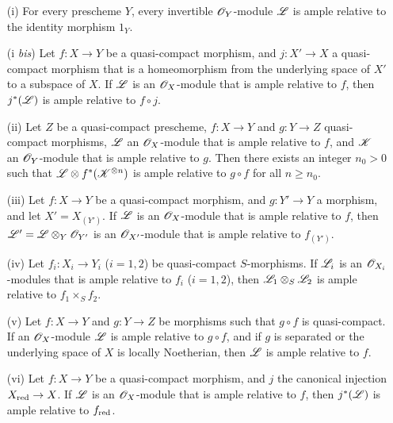 \begin{proposition}[4.6.13]
\label{II.4.6.13}
\begin{enumerate}
  \item[\rm{(i)}] For every prescheme $Y$, every invertible $\mathscr{O}_Y$-module $\mathscr{L}$ is ample relative to the identity morphism $1_Y$.
  \item[\rm{(i \emph{bis})}] Let $f:X\to Y$ be a quasi-compact morphism, and $j:X'\to X$ a quasi-compact morphism that is a homeomorphism from the underlying space of $X'$ to a subspace of $X$.
    If $\mathscr{L}$ is an $\mathscr{O}_X$-module that is ample relative to $f$, then $j^*(\mathscr{L})$ is ample relative to $f\circ j$.
  \item[\rm{(ii)}] Let $Z$ be a quasi-compact prescheme, $f:X\to Y$ and $g:Y\to Z$ quasi-compact morphisms, $\mathscr{L}$ an $\mathscr{O}_X$-module that is ample relative to $f$, and $\mathscr{K}$ an $\mathscr{O}_Y$-module that is ample relative to $g$.
    Then there exists an integer $n_0>0$ such that $\mathscr{L}\otimes f^*(\mathscr{K}^{\otimes n})$ is ample relative to $g\circ f$ for all $n\geq n_0$.
  \item[\rm{(iii)}] Let $f:X\to Y$ be a quasi-compact morphism, and $g:Y'\to Y$ a morphism, and let $X'=X_{(Y')}$.
    If $\mathscr{L}$ is an $\mathscr{O}_X$-module that is ample relative to $f$, then $\mathscr{L}'=\mathscr{L}\otimes_Y\mathscr{O}_{Y'}$ is an $\mathscr{O}_{X'}$-module that is ample relative to $f_{(Y')}$.
  \item[\rm{(iv)}] Let $f_i:X_i\to Y_i$ ($i=1,2$) be quasi-compact $S$-morphisms.
    If $\mathscr{L}_i$ is an $\mathscr{O}_{X_i}$-modules that is ample relative to $f_i$ ($i=1,2$), then $\mathscr{L}_1\otimes_S\mathscr{L}_2$ is ample relative to $f_1\times_S f_2$.
  \item[\rm{(v)}] Let $f:X\to Y$ and $g:Y\to Z$ be morphisms such that $g\circ f$ is quasi-compact.
    If an
    $\mathscr{O}_X$-module $\mathscr{L}$ is ample relative to $g\circ f$, and if $g$ is separated or the underlying space of $X$ is locally Noetherian, then $\mathscr{L}$ is ample relative to $f$.
  \item[\rm{(vi)}] Let $f:X\to Y$ be a quasi-compact morphism, and $j$ the canonical injection $X_\red\to X$.
    If $\mathscr{L}$ is an $\mathscr{O}_X$-module that is ample relative to $f$, then $j^*(\mathscr{L})$ is ample relative to $f_{\mathrm{red}}$.
\end{enumerate}
\end{proposition}

